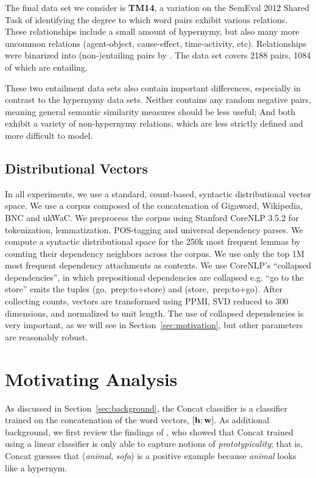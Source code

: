 The final data set we consider is {\bf TM14}, a variation on the SemEval 2012
Shared Task of identifying the degree to which word pairs exhibit various
relations. These relationships include a small amount of hypernymy, but also
many more uncommon relations (agent-object, cause-effect, time-activity, etc).
Relationships were binarized into (non-)entailing pairs by
.  The data set covers 2188 pairs, 1084 of which are
entailing.

These two entailment data sets also contain important differences, especially
in contrast to the hypernymy data sets. Neither contains any random negative
pairs, meaning general semantic similarity measures should be less useful; And
both exhibit a variety of non-hypernymy relations, which are less
strictly defined and more difficult to model.

\subsection{Distributional Vectors}

In all experiments, we use a standard, count-based, syntactic distributional
vector space.  We use a corpus composed of the concatenation of Gigaword,
Wikipedia, BNC and ukWaC. We preprocess the corpus using Stanford CoreNLP 3.5.2
\cite{chen:2014:emnlp} for tokenization, lemmatization, POS-tagging and
universal dependency parses. We compute a syntactic distributional space for
the 250k most frequent lemmas by counting their dependency neighbors across the
corpus. We use only the top 1M most frequent dependency attachments as
contexts.  We use CoreNLP's ``collapsed dependencies'', in which prepositional
dependencies are collapsed e.g.  ``go to the store'' emits the tuples
(go,~prep:to+store) and (store,~prep:to\depinv+go).  After collecting counts,
vectors are transformed using PPMI, SVD reduced to 300 dimensions, and
normalized to unit length. The use of collapsed dependencies is very important,
as we will see in Section~\ref{sec:motivation}, but other parameters are
reasonably robust.

\section{Motivating Analysis}

As discussed in Section~\ref{sec:background}, the Concat classifier is
a classifier trained on the concatenation of the word vectors, $[{\mathbf{h}}; {\mathbf{w}}]$.
As additional background, we first review the findings of
, who showed that Concat trained using a linear
classifier is only able to capture
notions of {\em prototypicality}; that is, Concat guesses that ({\em animal}, {\em sofa})
is a positive example because {\em animal} looks like a hypernym.

